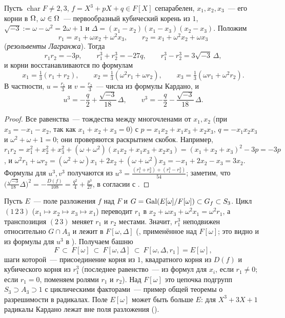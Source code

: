 \begin{proposition}[4.7d]
Пусть $\operatorname{char}F\ne2,3$, $f=X^3+pX+q\in F[X]$ сепарабелен, $x_1,x_2,x_3$~--- его корни в $\Omega$, $\omega\in\Omega$~---
первообразный кубический корень из $1$, $\sqrt{-3}:=\omega-\omega^2=2\omega+1$ и $\Delta=(x_1-x_2)(x_1-x_3)(x_2-x_3)$. Положим
\[
r_1=x_1+\omega x_2+\omega^2x_3,\qquad r_2=x_1+\omega^2x_2+\omega x_3
\]
(\emph{резольвенты Лагранжа}). Тогда
\[
r_1r_2=-3p,\qquad r_1^3+r_2^3=-27q,\qquad r_1^3-r_2^3=3\sqrt{-3}\,\Delta,
\]
и корни восстанавливаются по формулам
\[
x_1=\tfrac13(r_1+r_2),\qquad x_2=\tfrac13(\omega^2r_1+\omega r_2),\qquad x_3=\tfrac13(\omega r_1+\omega^2r_2).
\]
В частности, $u=\frac{r_1}3$ и $v=\frac{r_2}3$~--- числа из формулы Кардано, и
\[
u^3=-\frac q2+\frac{\sqrt{-3}}{18}\,\Delta,\qquad v^3=-\frac q2-\frac{\sqrt{-3}}{18}\,\Delta .
\]
\end{proposition}

\begin{proof}
Все равенства~--- тождества между многочленами от $x_1,x_2$ (при $x_3=-x_1-x_2$, так как $x_1+x_2+x_3=0$) с
$p=x_1x_2+x_1x_3+x_2x_3$, $q=-x_1x_2x_3$ и $\omega^2+\omega+1=0$; они проверяются раскрытием скобок. Например,
$r_1r_2=x_1^2+x_2^2+x_3^2+(\omega+\omega^2)(x_1x_2+x_1x_3+x_2x_3)=(x_1+x_2+x_3)^2-3p=-3p$, и
$\omega^2r_1+\omega r_2=(\omega^2+\omega)x_1+2x_2+(\omega+\omega^2)x_3=-x_1+2x_2-x_3=3x_2$. Формулы для $u^3,v^3$ получаются из
$u^3=\frac{(r_1^3+r_2^3)+(r_1^3-r_2^3)}{54}$; заметим, что $\bigl(\frac{\sqrt{-3}}{18}\Delta\bigr)^2=-\frac{D(f)}{108}=\frac{q^2}4+\frac{p^3}{27}$,
в согласии с .
\end{proof}

\begin{remark}
Пусть $E$~--- поле разложения $f$ над $F$ и $G=\operatorname{Gal}(E[\omega]/F[\omega])\subset G_f\subset S_3$. Цикл $(1\,2\,3)$ ($x_1\mapsto x_2\mapsto
x_3\mapsto x_1$) переводит $r_1$ в $x_2+\omega x_3+\omega^2x_1=\omega^2r_1$, а транспозиция $(2\,3)$ меняет $r_1$ и $r_2$ местами. Значит,
$r_1^3$ неподвижен относительно $G\cap A_3$ и лежит в $F[\omega,\Delta]$ (, применённое над $F[\omega]$; это видно и из
формулы для $u^3$ в ). Получаем башню
\[
F\ \subset\ F[\omega]\ \subset\ F[\omega,\Delta]\ \subset\ F[\omega,\Delta,r_1]=E[\omega],
\]
шаги которой~--- присоединение корня из $1$, квадратного корня из $D(f)$ и кубического корня из $r_1^3$ (последнее
равенство~--- из формул  для $x_i$, если $r_1\ne0$; если $r_1=0$, поменяем ролями $r_1$ и $r_2$). Над $F[\omega]$ это
цепочка подгрупп $S_3\supset A_3\supset1$ с циклическими факторами~--- пример общей теоремы  о разрешимости в
радикалах. Поле $E[\omega]$ может быть больше $E$: для $X^3+3X+1$ радикалы Кардано лежат вне поля разложения ().
\end{remark}

